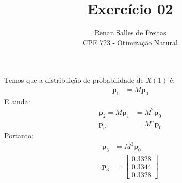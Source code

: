 \documentclass[12pt]{article}
\newenvironment{exercise}[2][Exercício]{\begin{trivlist}
\item[\hskip \labelsep {\bfseries #1}\hskip \labelsep {\bfseries #2.}]}{\end{trivlist}}
\begin{document}
 
 
\title{Exercício 02}
\author{Renan Salles de Freitas\\
CPE 723 - Otimização Natural}
 
\maketitle
 
\begin{exercise}{1.a}
Temos que a distribuição de probabilidade de $X(1)$ é:
\begin{align*}
\textbf{p}_1 &= M\textbf{p}_0
\end{align*}
E ainda:
\begin{align*}
\textbf{p}_2 = M\textbf{p}_1 &= M^2\textbf{p}_0 \\
\textbf{p}_n &= M^n\textbf{p}_0
\end{align*}
Portanto:
\begin{align*}
\textbf{p}_3 &= M^3\textbf{p}_0 \\
\textbf{p}_3 &= \begin{bmatrix}
0.3328 \\ 0.3344 \\ 0.3328
\end{bmatrix}
\end{align*}
\end{exercise}
 
\end{document}

